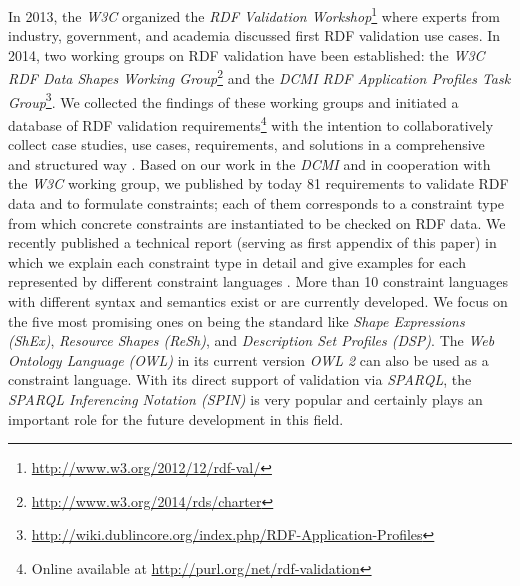 \documentclass[a4paper,fontsize=11pt]{scrartcl}
\begin{document}
In 2013, the \emph{W3C} organized the \emph{RDF Validation Workshop}\footnote{\url{http://www.w3.org/2012/12/rdf-val/}}
where experts from industry, government, and academia discussed first RDF validation use cases. 
In 2014, two working groups on RDF validation have been established: 
the \emph{W3C RDF Data Shapes Working Group}\footnote{\url{http://www.w3.org/2014/rds/charter}} and the \emph{DCMI RDF Application Profiles Task Group}\footnote{\url{http://wiki.dublincore.org/index.php/RDF-Application-Profiles}}. 
We collected the findings of these working groups and initiated a database of RDF validation requirements\footnote{Online available at \url{http://purl.org/net/rdf-validation}}
with the intention to collaboratively collect case studies, use cases, requirements, and solutions in a comprehensive and structured way \cite{BoschEckert2014}. 
Based on our work in the \emph{DCMI} and in cooperation with the \emph{W3C} working group,
we published by today 81 requirements to validate RDF data and to formulate constraints; 
each of them corresponds to a constraint type from which concrete constraints are instantiated to be checked on RDF data. 
We recently published a technical report (serving as first appendix of this paper) in which we explain each constraint type in detail and give examples for each represented by different constraint languages \cite{BoschNolleAcarEckert2015}.
More than 10 constraint languages with different syntax and semantics exist or are currently developed. 
We focus on the five most promising ones on being the standard like
\emph{Shape Expressions (ShEx)}, \emph{Resource Shapes (ReSh)}, and \emph{Description Set Profiles (DSP)}. 
The \emph{Web Ontology Language} \emph{(OWL)} in its current version \emph{OWL 2} can also be used as a constraint language.
With its direct support of validation via \emph{SPARQL}, the \emph{SPARQL Inferencing Notation (SPIN)} is very popular and certainly plays an important role for the future development in this field. 
\end{document}
